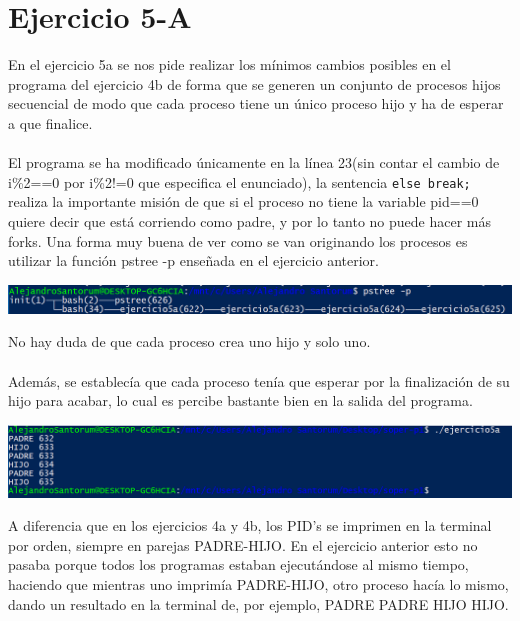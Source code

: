 \documentclass[12pt]{article}
\begin{document}
\section{Ejercicio 5-A}
En el ejercicio 5a se nos pide realizar los mínimos cambios posibles en el programa del ejercicio 4b de forma que se generen un conjunto de procesos hijos secuencial de modo que cada proceso tiene un único proceso hijo y ha de esperar a que finalice.\\\\
El programa se ha modificado únicamente en la línea 23(sin contar el cambio de i\%2==0 por i\%2!=0 que especifica el enunciado), la sentencia \texttt{else break;} realiza la importante misión de que si el proceso no tiene la variable pid==0 quiere decir que está corriendo como padre, y por lo tanto no puede hacer más forks. Una forma muy buena de ver como se van originando los procesos es utilizar la función pstree -p enseñada en el ejercicio anterior.
\begin{center}
	\includegraphics[scale=0.95]{ej5a_pstree.PNG}
\end{center}
No hay duda de que cada proceso crea uno hijo y solo uno.\\\\
Además, se establecía que cada proceso tenía que esperar por la finalización de su hijo para acabar, lo cual es percibe bastante bien en la salida del programa.
\begin{center}
	\includegraphics[scale=0.9]{ej5a.PNG}
\end{center}
A diferencia que en los ejercicios 4a y 4b, los PID's se imprimen en la terminal por orden, siempre en parejas PADRE-HIJO. En el ejercicio anterior esto no pasaba porque todos los programas estaban ejecutándose al mismo tiempo, haciendo que mientras uno imprimía PADRE-HIJO, otro proceso hacía lo mismo, dando un resultado en la terminal de, por ejemplo, PADRE PADRE HIJO HIJO.\\
\end{document}

